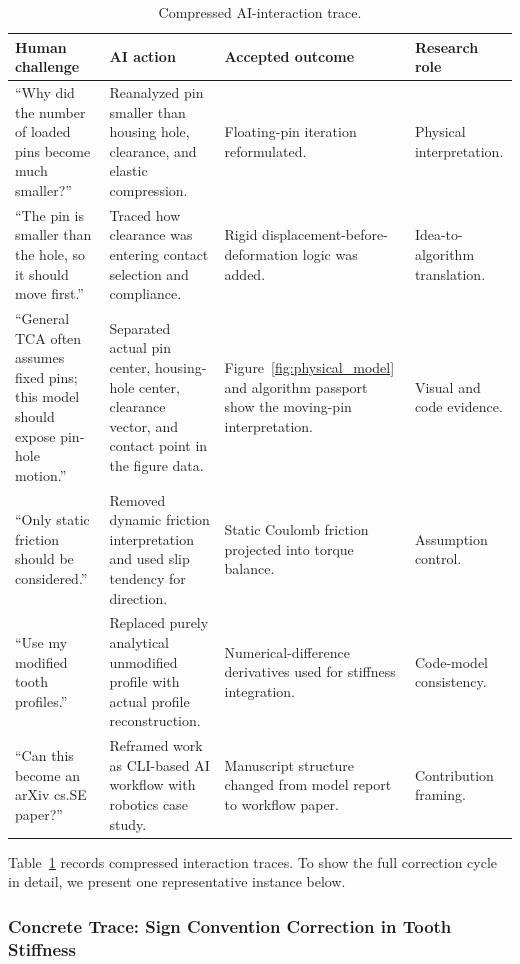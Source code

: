 \documentclass{article}
\newcommand{\revmark}{\marginpar{\footnotesize\textcolor{blue}{\textbf{Rev.\,2}}}}
\begin{document}
\begin{table}[t]
\caption{Compressed AI-interaction trace.}
\centering
\small
\begin{tabular}{p{3.4cm}p{4.0cm}p{3.4cm}p{2.4cm}}
\toprule
\textbf{Human challenge} & \textbf{AI action} & \textbf{Accepted outcome} & \textbf{Research role} \\
\midrule
``Why did the number of loaded pins become much smaller?'' & Reanalyzed pin smaller than housing hole, clearance, and elastic compression. & Floating-pin iteration reformulated. & Physical interpretation. \\
``The pin is smaller than the hole, so it should move first.'' & Traced how clearance was entering contact selection and compliance. & Rigid displacement-before-deformation logic was added. & Idea-to-algorithm translation. \\
``General TCA often assumes fixed pins; this model should expose pin-hole motion.'' & Separated actual pin center, housing-hole center, clearance vector, and contact point in the figure data. & Figure~\ref{fig:physical_model} and algorithm passport show the moving-pin interpretation. & Visual and code evidence. \\
``Only static friction should be considered.'' & Removed dynamic friction interpretation and used slip tendency for direction. & Static Coulomb friction projected into torque balance. & Assumption control. \\
``Use my modified tooth profiles.'' & Replaced purely analytical unmodified profile with actual profile reconstruction. & Numerical-difference derivatives used for stiffness integration. & Code-model consistency. \\
``Can this become an arXiv cs.SE paper?'' & Reframed work as CLI-based AI workflow with robotics case study. & Manuscript structure changed from model report to workflow paper. & Contribution framing. \\
\bottomrule
\end{tabular}
\label{tab:trace}
\end{table}

Table~\ref{tab:trace} records compressed interaction traces. To show the full correction cycle in detail, we present one representative instance below.

\subsubsection{Concrete Trace: Sign Convention Correction in Tooth Stiffness}\revmark
\end{document}

